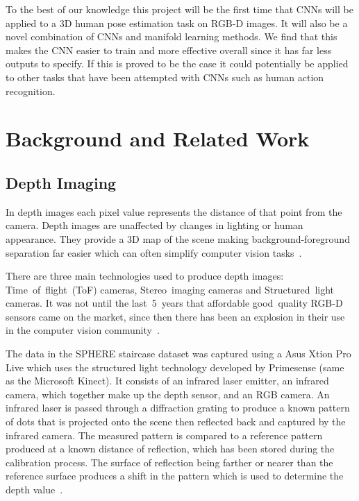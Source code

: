 \documentclass[11pt]{article} %
\begin{document}

To the best of our knowledge this project will be the first time that CNNs will be applied to a 3D human pose estimation task on RGB-D images. It will also be a novel combination of CNNs and manifold learning methods. We find that this makes the CNN easier to train and more effective overall since it has far less outputs to specify. If this is proved to be the case it could potentially be applied to other tasks that have been attempted with CNNs such as human action recognition.




\section{Background and Related Work}

\subsection{Depth Imaging}
\label{sec:Depth}


In depth images each pixel value represents the distance of that point from the camera. Depth images are unaffected by changes in lighting or human appearance. They provide a 3D map of the scene making background-foreground separation far easier which can often simplify computer vision tasks~\cite{Chen2013}.

There are three main technologies used to produce depth images: Time~of~flight~(ToF) cameras, Stereo~imaging cameras and Structured~light cameras. It was not until the last~5~years that affordable good~quality RGB-D sensors came on the market, since then there has been an explosion in their use in the computer vision community~\cite{Han2013}.

 The data in the SPHERE staircase dataset was captured using a Asus Xtion Pro Live which uses the structured light technology developed by Primesense (same as the Microsoft Kinect). It consists of an infrared laser emitter, an infrared camera, which together make up the depth sensor, and an RGB camera. An infrared laser is passed through a diffraction grating to produce a known pattern of dots that is projected onto the scene then reflected back and captured by the infrared camera. The measured pattern is compared to a reference pattern produced at a known distance of reflection, which has been stored during the calibration process. The surface of reflection being farther or nearer than the reference surface produces a shift in the pattern which is used to determine the depth value~\cite{Zhang2012a,Khoshelham2012a}.
\end{document}
